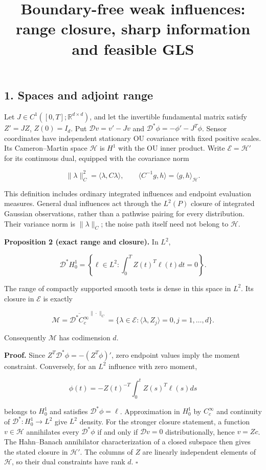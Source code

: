 \documentclass[
  american,
  11pt,
]{article}
\title{Boundary-free weak influences: range closure, sharp information
and feasible GLS}
\author{}
\date{}
\begin{document}
\maketitle

\subsection{1. Spaces and adjoint range}\label{spaces-and-adjoint-range}

Let \(J\in C^1([0,T];\mathbb R^{d\times d})\), and let the invertible
fundamental matrix satisfy \(Z'=JZ\), \(Z(0)=I_d\). Put
\(\mathcal D v=v'-Jv\) and \(\mathcal D^*\phi=-\phi'-J^T\phi\). Sensor
coordinates have independent stationary OU covariance with fixed
positive scales. Its Cameron--Martin space \(\mathcal H\) is \(H^1\)
with the OU inner product. Write \(\mathcal E=\mathcal H'\) for its
continuous dual, equipped with the covariance norm

\[
\|\lambda\|_C^2=\langle\lambda,C\lambda\rangle,
\qquad
\langle C^{-1}g,h\rangle=\langle g,h\rangle_{\mathcal H}.
\]

This definition includes ordinary integrated influences and endpoint
evaluation measures. General dual influences act through the \(L^2(P)\)
closure of integrated Gaussian observations, rather than a pathwise
pairing for every distribution. Their variance norm is
\(\|\lambda\|_C\); the noise path itself need not belong to
\(\mathcal H\).

\textbf{Proposition 2 (exact range and closure).} In \(L^2\),

\[
\mathcal D^*H_0^1
=\left\{\ell\in L^2:\int_0^T Z(t)^T\ell(t)dt=0\right\}.
\]

The range of compactly supported smooth tests is dense in this space in
\(L^2\). Its closure in \(\mathcal E\) is exactly

\[
\mathcal M=\overline{\mathcal D^*C_c^\infty}^{\|\cdot\|_C}
=\{\lambda\in\mathcal E:\langle\lambda,Z_j\rangle=0, j=1,\ldots,d\}.
\]

Consequently \(\mathcal M\) has codimension \(d\).

\textbf{Proof.} Since \(Z^T\mathcal D^*\phi=-(Z^T\phi)'\), zero endpoint
values imply the moment constraint. Conversely, for an \(L^2\) influence
with zero moment,

\[
\phi(t)=-Z(t)^{-T}\int_0^t Z(s)^T\ell(s)ds
\]

belongs to \(H_0^1\) and satisfies \(\mathcal D^*\phi=\ell\).
Approximation in \(H_0^1\) by \(C_c^\infty\) and continuity of
\(\mathcal D^*:H_0^1\to L^2\) give \(L^2\) density. For the stronger
closure statement, a function \(v\in\mathcal H\) annihilates every
\(\mathcal D^*\phi\) if and only if \(\mathcal D v=0\) distributionally,
hence \(v=Zc\). The Hahn--Banach annihilator characterization of a
closed subspace then gives the stated closure in \(\mathcal H'\). The
columns of \(Z\) are linearly independent elements of \(\mathcal H\), so
their dual constraints have rank \(d\). \(\square\)
\end{document}
